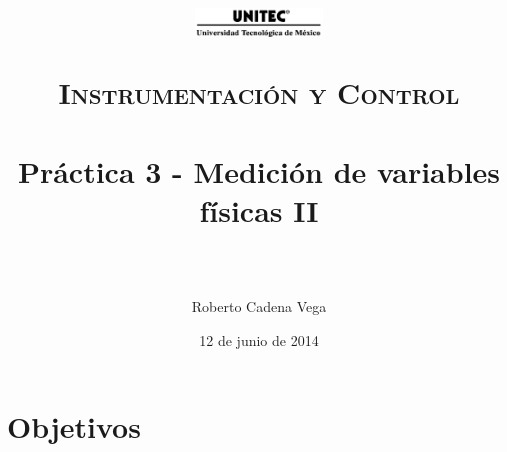 



\title{
	\normalfont \normalsize
	\begin{figure}[h]
		\begin{center}
			\includegraphics[width=0.3\textwidth]{../images/UNITEC.png} %
		\end{center}
	\end{figure}
	\textsc{Instrumentación y Control} \\ [25pt]
	\horrule{0.5pt} \\[0.4cm] %
	\huge Práctica 3 - Medición de variables físicas II \\ %
	\horrule{2pt} \\[0.5cm] %
}

\author{Roberto Cadena Vega} %

\date{\normalsize 12 de junio de 2014} %




\maketitle %


\section{Objetivos}

